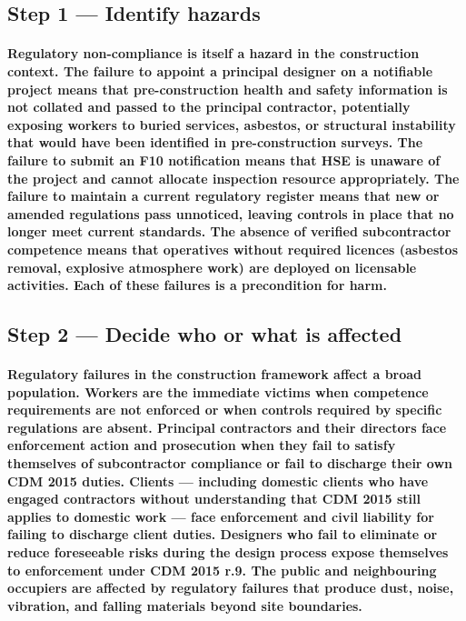 \subsection{Step 1 --- Identify hazards}
\paragraph{Regulatory non-compliance is itself a hazard in the construction context. The failure to appoint a principal designer on a notifiable project means that pre-construction health and safety information is not collated and passed to the principal contractor, potentially exposing workers to buried services, asbestos, or structural instability that would have been identified in pre-construction surveys. The failure to submit an F10 notification means that HSE is unaware of the project and cannot allocate inspection resource appropriately. The failure to maintain a current regulatory register means that new or amended regulations pass unnoticed, leaving controls in place that no longer meet current standards. The absence of verified subcontractor competence means that operatives without required licences (asbestos removal, explosive atmosphere work) are deployed on licensable activities. Each of these failures is a precondition for harm.}

\subsection{Step 2 --- Decide who or what is affected}
\paragraph{Regulatory failures in the construction framework affect a broad population. Workers are the immediate victims when competence requirements are not enforced or when controls required by specific regulations are absent. Principal contractors and their directors face enforcement action and prosecution when they fail to satisfy themselves of subcontractor compliance or fail to discharge their own CDM 2015 duties. Clients --- including domestic clients who have engaged contractors without understanding that CDM 2015 still applies to domestic work --- face enforcement and civil liability for failing to discharge client duties. Designers who fail to eliminate or reduce foreseeable risks during the design process expose themselves to enforcement under CDM 2015 r.9. The public and neighbouring occupiers are affected by regulatory failures that produce dust, noise, vibration, and falling materials beyond site boundaries.}

